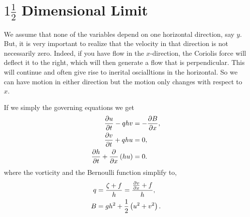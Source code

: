 \documentclass[letterpaper,10pt,english]{sphinxmanual}
\begin{document}
\section{\(1 \frac{1}{2}\) Dimensional Limit}
\label{sw_intro:dimensional-limit}
We assume that none of the variables depend on one horizontal direction,
say \(y\). But, it is very important to realize that the velocity in
that direction is not necessarily zero. Indeed, if you have flow in the
\(x\)-direction, the Coriolis force will deflect it to the right,
which will then generate a flow that is perpendicular. This will
continue and often give rise to inerital oscialltions in the horizontal.
So we can have motion in either direction but the motion only changes
with respect to \(x\).

If we simply the governing equations we get
\begin{gather}
\begin{split}\begin{aligned}
\frac{\partial u}{\partial t}  - q h v
&= - \frac{\partial B}{\partial x},\\
\frac{\partial v}{\partial t}  + q h u
&= 0,\\
\frac{\partial h}{\partial t} + \frac{\partial}{\partial x} \left( h u \right) &= 0.\end{aligned}\end{split}\notag
\end{gather}
where the vorticity and the Bernoulli function simplify to,
\begin{gather}
\begin{split}\begin{aligned}
q & = \frac{\zeta + f}{h} = \frac{\frac{\partial v}{\partial x} + f}{h},\\
B & = g h^2 + \frac12 \left( u^2 + v^2 \right).\end{aligned}\end{split}\notag
\end{gather}
\end{document}
